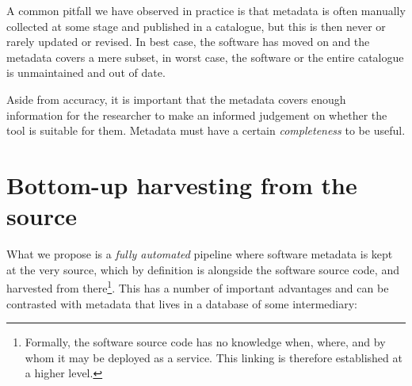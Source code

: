 \documentclass[a4paper,11pt]{article}
\begin{document}
A common pitfall we have observed in practice is that metadata is often
manually collected at some stage and published in a catalogue, but this is then
never or rarely updated or revised. In best case, the software has moved on and the
metadata covers a mere subset, in worst case, the software or the entire
catalogue is unmaintained and out of date.

Aside from accuracy, it is important that the metadata covers enough
information for the researcher to make an informed judgement on whether the
tool is suitable for them. Metadata must have a certain \emph{completeness} to
be useful.

\section{Bottom-up harvesting from the source}

What we propose is a \emph{fully automated} pipeline where software metadata is
kept at the very source, which by definition is alongside the software source
code, and harvested from there\footnote{Formally, the software source code has
no knowledge when, where, and by whom it may be deployed as a service. This linking is
therefore established at a higher level.}. This has a number of important advantages and
can be contrasted with metadata that lives in a database of some intermediary:
\end{document}

